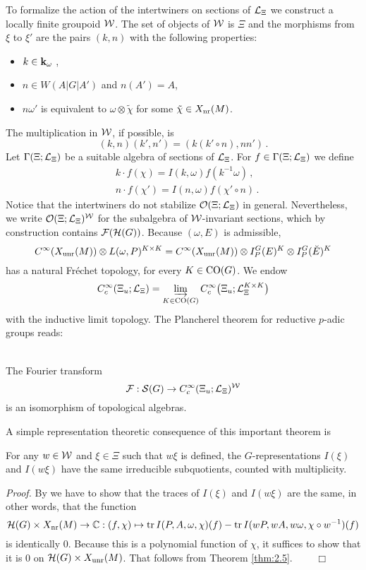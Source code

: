 To formalize the action of the intertwiners on sections of $\mathcal
L_\Xi$ we construct a locally finite groupoid $\mathcal W$. The set of
objects of $\mathcal W$ is $\Xi$ and the morphisms from $\xi$ to $\xi'$
are the pairs $(k,n)$ with the following properties:
\begin{itemize}
\item $k \in \mathbf k_\omega$ ,
\item $n \in W(A|G|A')$ and $n (A') = A$,
\item $n \omega'$ is equivalent to $\omega \otimes \tilde \chi$
for some $\tilde \chi \in X_{\mathrm{nr}} (M) $.
\end{itemize}
The multiplication in $\mathcal W$, if possible, is
\[
(k,n) (k',n') = (k (k' \circ n),n n') \,.
\]
Let $\Gamma (\Xi ;\mathcal L_\Xi)$ be a suitable algebra of sections of
$\mathcal L_\Xi$. For $f \in \Gamma (\Xi ;\mathcal L_\Xi)$ we define
\begin{align*}
& k \cdot f (\chi) = I(k, \omega) f(k^{-1} \omega) \,,\\
& n \cdot f (\chi' ) = I(n,\omega ) f (\chi' \circ n) \,.
\end{align*}
Notice that the intertwiners do not stabilize $\mathcal O (\Xi ;\mathcal L_\Xi )$ in general.
Nevertheless, we write $\mathcal O (\Xi ;\mathcal L_\Xi )^{\mathcal W}$ for the subalgebra of
$\mathcal W$-invariant sections, which by construction contains $\mathcal F (\mathcal H (G))$.
Because $(\omega,E)$ is admissible,
\[
C^\infty (X_{\mathrm{unr}} (M)) \otimes L(\omega,P)^{K \times K} = C^\infty
(X_{\mathrm{unr}} (M)) \otimes I_P^G (E)^K \otimes I_P^G (\breve E )^K
\]
has a natural Fr\'echet topology, for every $K \in \mathrm{CO}(G)$. We endow
\[
C_c^\infty (\Xi_u ;\mathcal L_\Xi) = \varinjlim_{K \in
\mathrm{CO}(G)} C_c^\infty \big( \Xi_u ; \mathcal L_\Xi^{K \times K} \big)
\]
with the inductive limit topology. The Plancherel theorem for
reductive $p$-adic groups reads:

\begin{thm}\label{thm:2.5} \textup{\cite{HC2,Wal}} \\
The Fourier transform
\[
\mathcal F : \mathcal S (G) \to C_c^\infty (\Xi_u ;\mathcal L_\Xi )^{\mathcal W}
\]
is an isomorphism of topological algebras.
\end{thm}

A simple representation theoretic consequence of this important theorem is

\begin{cor}\label{cor:2.15}
For any $w \in \mathcal W$ and $\xi \in \Xi$ such that $w \xi$ is
defined, the $G$-representations $I(\xi )$ and $I(w \xi )$ have the
same irreducible subquotients, counted with multiplicity.
\end{cor}
\emph{Proof.}
By \cite[Corollary 2.3.3]{Cas} we have to show that the traces of $I(\xi )$ and 
$I(w \xi )$ are the same, in other words, that the function
\begin{equation*}
\mathcal H (G) \times X_{\mathrm{nr}} (M) \to \mathbb C : (f ,\chi) \mapsto
\mathrm{tr}\, I(P,A,\omega ,\chi )(f) - 
\mathrm{tr}\, I (wP,wA,w \omega ,\chi \circ w^{-1})(f)
\end{equation*}
is identically 0. Because this is a polynomial function of $\chi$,
it suffices to show that it is 0 on $\mathcal H (G) \times X_{\mathrm{unr}} (M)$.
That follows from Theorem \ref{thm:2.5}. $\qquad \Box$
\\[2mm]

